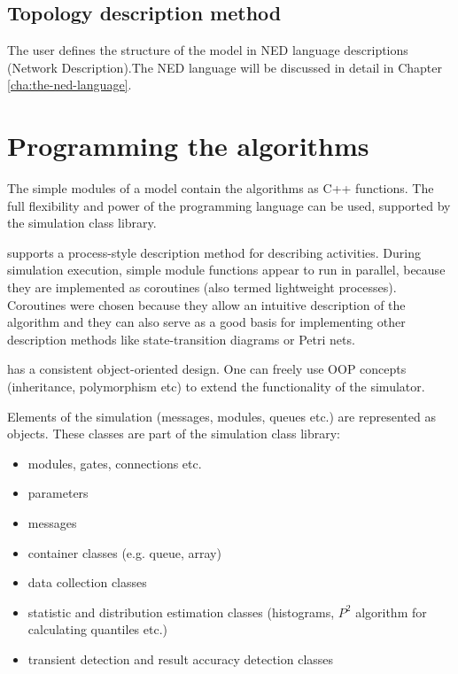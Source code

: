 \subsection{Topology description method}
The user defines the structure of the model in NED language descriptions
(Network Description).The NED language will be discussed in detail
in Chapter \ref{cha:the-ned-language}.


\section{Programming the algorithms}

The simple modules of a model contain the algorithms as C++ functions.
The full flexibility and power of the programming language can
be used, supported by the {\opp} simulation class library.


{\opp} supports a process-style description
method for describing activities. During simulation execution,
simple module functions appear to run in parallel,
because they are implemented as coroutines (also
termed lightweight processes). Coroutines were chosen because they allow an
intuitive description of the algorithm and they can also serve as a good
basis for implementing other description methods like state-transition
diagrams or Petri
nets.

{\opp} has a consistent object-oriented design. One can freely
use OOP concepts (inheritance, polymorphism etc) to extend the
functionality of the simulator.

Elements of the simulation (messages, modules, queues etc.) are
represented as objects. These classes are part of the simulation
class library:
\begin{itemize}
\item{modules, gates, connections etc.}
\item{parameters}
\item{messages}
\item{container classes (e.g. queue, array)}
\item{data collection classes}
\item{statistic and distribution estimation classes (histograms, $P^{2}$
algorithm for calculating quantiles etc.)}
\item{transient detection and result accuracy detection classes}
\end{itemize}

